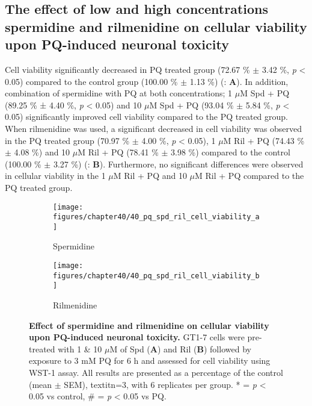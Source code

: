 \subsection{The effect of low and high concentrations spermidine and rilmenidine on cellular viability upon PQ-induced neuronal toxicity} 
Cell viability significantly decreased in PQ treated group (72.67 \% $\pm$ 3.42 \%, \textit{p} < 0.05) compared to the control group (100.00 \% $\pm$ 1.13 \%) (: \textbf{A}). In addition, combination of spermidine with PQ at both concentrations; 1 $\mu$M Spd + PQ (89.25 \% ± 4.40 \%, \textit{p} < 0.05) and 10 $\mu$M Spd + PQ (93.04 \% $\pm$ 5.84 \%, \textit{p} < 0.05) significantly improved cell viability compared to the PQ treated group. When rilmenidine was used, a significant decreased in cell viability was observed in the PQ treated group (70.97 \% $\pm$ 4.00 \%, \textit{p} < 0.05), 1 $\mu$M Ril + PQ (74.43 \% $\pm$ 4.08 \%) and 10 $\mu$M Ril + PQ (78.41 \% $\pm$ 3.98 \%) compared to the control (100.00 \% $\pm$ 3.27 \%) (: \textbf{B}). Furthermore, no significant differences were observed in cellular viability in the 1 $\mu$M Ril + PQ and 10 $\mu$M Ril + PQ compared to the PQ treated group.

\begin{figure}[!htbp]
  \center
  \begin{subfigure}[b]{0.495\linewidth}
    \texttt{[image: figures/chapter40/40\_pq\_spd\_ril\_cell\_viability\_a]}
    \caption{Spermidine}
  \end{subfigure}
  \begin{subfigure}[b]{0.495\linewidth}
    \texttt{[image: figures/chapter40/40\_pq\_spd\_ril\_cell\_viability\_b]}
    \caption{Rilmenidine}
  \end{subfigure}
  \caption[Effect of spermidine and rilmenidine on cellular viability upon PQ-induced neuronal toxicity]{\textbf{Effect of spermidine and rilmenidine on cellular viability upon PQ-induced neuronal toxicity.} GT1-7 cells were pre-treated with 1 \& 10 $\mu$M of Spd (\textbf{A}) and Ril (\textbf{B}) followed by exposure to 3 mM PQ for 6 h and assessed for cell viability using WST-1 assay. All results are presented as a percentage of the control (mean $\pm$ SEM), textit{n}=3, with 6 replicates per group. * = \textit{p} < 0.05 vs control, \# = \textit{p} < 0.05 vs PQ.}
  \label{fig:40_pq_spd_ril_cell_viability_a}
\end{figure}

